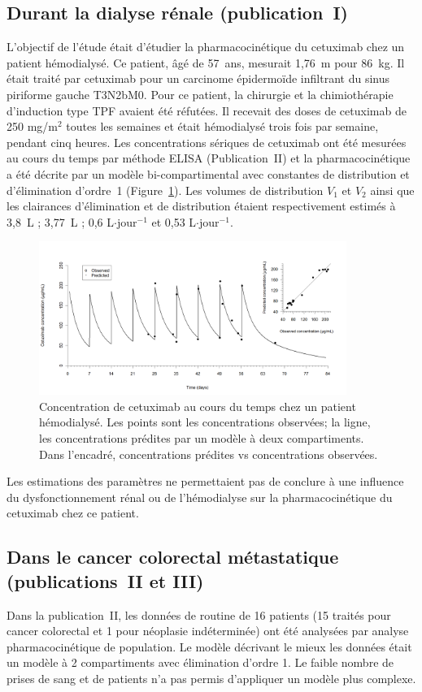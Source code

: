 \subsection{Durant la dialyse rénale (publication~I)}
L'objectif de l'étude était d'étudier la pharmacocinétique du cetuximab chez un patient hémodialysé. Ce patient, âgé de 57~ans, mesurait 1,76~m pour 86~kg. Il était traité par cetuximab pour un carcinome épidermoïde infiltrant du sinus piriforme gauche T3N2bM0. Pour ce patient, la chirurgie et la chimiothérapie d'induction type TPF avaient été réfutées. Il recevait des doses de cetuximab de 250 mg/m$^2$ toutes les semaines et était hémodialysé trois fois par semaine, pendant cinq heures. Les concentrations sériques de cetuximab ont été mesurées au cours du temps par méthode ELISA (Publication~II) et la pharmacocinétique a été décrite par un modèle bi-compartimental avec constantes de distribution et d'élimination d'ordre~1 (Figure~\ref{fig:18}). Les volumes de distribution $V_1$ et $V_2$ ainsi que les clairances d'élimination et de distribution étaient respectivement estimés à 3,8~L ; 3,77~L ; 0,6 L$\cdot$jour$^{-1}$ et 0,53 L$\cdot$jour$^{-1}$. 
\begin{figure}[htbp]
	\centering
		\includegraphics[width=10cm]{figures/raster/FIG_18}
	\caption[Concentration de cetuximab au cours du temps chez un patient hémodialysé.]{Concentration de cetuximab au cours du temps chez un patient hémodialysé. Les points sont les concentrations observées; la ligne, les concentrations prédites par un modèle à deux compartiments. Dans l'encadré, concentrations prédites vs concentrations observées.}
	\label{fig:18}
\end{figure}

Les estimations des paramètres ne permettaient pas de conclure à une influence du dysfonctionnement rénal ou de l'hémodialyse sur la pharmacocinétique du cetuximab chez ce patient. 
\subsection{Dans le cancer colorectal métastatique (publications~II et III)}
Dans la publication~II, les données de routine de 16 patients (15 traités pour cancer colorectal et 1 pour néoplasie indéterminée) ont été analysées par analyse pharmacocinétique de population. Le modèle décrivant le mieux les données était un modèle à 2 compartiments avec élimination d'ordre 1. Le faible nombre de prises de sang et de patients n'a pas permis d'appliquer un modèle plus complexe.

